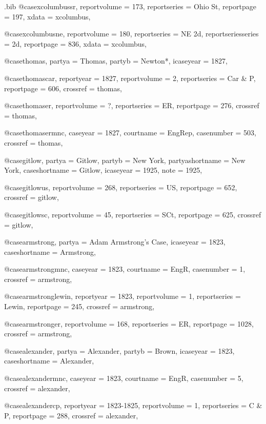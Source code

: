 \begin{filecontents*}[overwrite]{\jobname.bib}
@case{xcolumbussr,
  reportvolume = {173},
  reportseries = {Ohio St},
  reportpage = {197},
  xdata = {xcolumbus},
}

@case{xcolumbusne,
  reportvolume = {180},
  reportseries = {NE 2d},
  reportseriesseries = {2d},
  reportpage = {836},
  xdata = {xcolumbus},
}


@case{thomas,
  partya = {Thomas},
  partyb = {Newton*},
  icaseyear = {1827},
	}

@case{thomascar,
  reportyear = {1827},
  reportvolume = {2},
  reportseries = {Car \& P},
  reportpage = {606},
  crossref = {thomas},
}

@case{thomaser,
  reportvolume = {?},
  reportseries = {ER},
  reportpage = {276},
  crossref = {thomas},
}

@case{thomasermnc,
  caseyear = {1827},
  courtname = {EngRep},
  casenumber = {503},
  crossref = {thomas},
}


@case{gitlow,
  partya = {Gitlow},
  partyb = {New York},%
  partyashortname = {New York}, 
  caseshortname = {Gitlow},
  icaseyear = {1925},
  note = {1925},
	}


@case{gitlowus,
  reportvolume = {268},
  reportseries = {US},
  reportpage = {652},
  crossref = {gitlow},
}


@case{gitlowsc,
  reportvolume = {45},
  reportseries = {SCt},
  reportpage = {625},
  crossref = {gitlow},
}

@case{armstrong,
  partya = {Adam Armstrong's Case},
  icaseyear = {1823},
  caseshortname = {Armstrong},
	}

@case{armstrongmnc,
  caseyear = {1823},
  courtname = {EngR},
  casenumber = {1},
  crossref = {armstrong},
}


@case{armstronglewin,
  reportyear = {1823},
  reportvolume = {1},
  reportseries = {Lewin},
  reportpage = {245},
  crossref = {armstrong},
}

@case{armstronger,
  reportvolume = {168},
  reportseries = {ER},
  reportpage = {1028},
  crossref = {armstrong},
}




@case{alexander,
  partya = {Alexander},
  partyb = {Brown},
  icaseyear = {1823},
  caseshortname = {Alexander},
	}

@case{alexandermnc,
  caseyear = {1823},
  courtname = {EngR},
  casenumber = {5},
  crossref = {alexander},
}


@case{alexandercp,
  reportyear = {1823-1825},
  reportvolume = {1},
  reportseries = {C \& P},
  reportpage = {288},
  crossref = {alexander},
}


\end{filecontents*}

